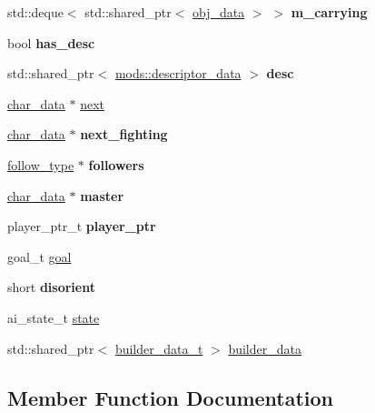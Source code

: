 \begin{DoxyCompactItemize}
std\+::deque$<$ std\+::shared\+\_\+ptr$<$ \hyperlink{structobj__data}{obj\+\_\+data} $>$ $>$ {\bfseries m\+\_\+carrying}
\item 
\mbox{\label{structchar__data_aa5c6d58b9e91efbafaad1c16b8591af0}} 
bool {\bfseries has\+\_\+desc}
\item 
\mbox{\label{structchar__data_aac9c9bc251de9fec15d8ee233bca8bab}} 
std\+::shared\+\_\+ptr$<$ \hyperlink{structmods_1_1descriptor__data}{mods\+::descriptor\+\_\+data} $>$ {\bfseries desc}
\item 
\hyperlink{structchar__data}{char\+\_\+data} $\ast$ \hyperlink{structchar__data_a80b37086e290d8137e1584645c35cec4}{next}
\item 
\mbox{\label{structchar__data_aae7d61549ad48307b167e62a1bf20153}} 
\hyperlink{structchar__data}{char\+\_\+data} $\ast$ {\bfseries next\+\_\+fighting}
\item 
\mbox{\label{structchar__data_af473afcbfc48e66123a704b7753c2ed3}} 
\hyperlink{structfollow__type}{follow\+\_\+type} $\ast$ {\bfseries followers}
\item 
\mbox{\label{structchar__data_aa063e7a1ff7ee40c34a5b1312bd16f19}} 
\hyperlink{structchar__data}{char\+\_\+data} $\ast$ {\bfseries master}
\item 
\mbox{\label{structchar__data_acfb58914d9cac998a6220cf677983eaf}} 
player\+\_\+ptr\+\_\+t {\bfseries player\+\_\+ptr}
\item 
goal\+\_\+t \hyperlink{structchar__data_a9ed1ce6d8adcefa2723c5812f648d08c}{goal}
\item 
\mbox{\label{structchar__data_acb854c7bc9e776ed51bdfdd267c01f0d}} 
short {\bfseries disorient}
\item 
ai\+\_\+state\+\_\+t \hyperlink{structchar__data_a551436fec9d0b71ed20243feee1a685e}{state}
\item 
std\+::shared\+\_\+ptr$<$ \hyperlink{structbuilder__data__t}{builder\+\_\+data\+\_\+t} $>$ \hyperlink{structchar__data_a560ec5d4891a5086b00063eb995bdf3e}{builder\+\_\+data}
\end{DoxyCompactItemize}


\subsection{Member Function Documentation}
\mbox{\label{structchar__data_ac08c59f455b01ef91858398b98c708fc}} 

